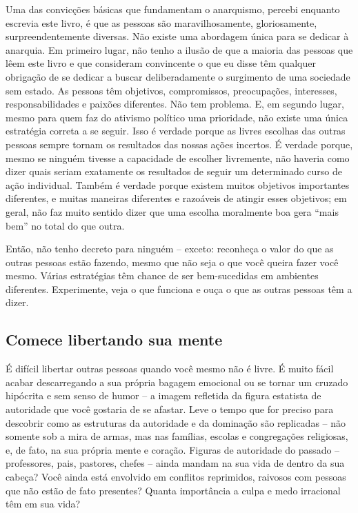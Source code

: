 Uma das convicções básicas que fundamentam o anarquismo, percebi enquanto escrevia este livro, é que as pessoas são maravilhosamente, gloriosamente, surpreendentemente diversas. Não existe uma abordagem única para se dedicar à anarquia. Em primeiro lugar, não tenho a ilusão de que a maioria das pessoas que lêem este livro e que consideram convincente o que eu disse têm qualquer obrigação de se dedicar a buscar deliberadamente o surgimento de uma sociedade sem estado. As pessoas têm objetivos, compromissos, preocupações, interesses, responsabilidades e paixões diferentes. Não tem problema. E, em segundo lugar, mesmo para quem faz do ativismo político uma prioridade, não existe uma única estratégia correta a se seguir. Isso é verdade porque as livres escolhas das outras pessoas sempre tornam os resultados das nossas ações incertos. É verdade porque, mesmo se ninguém tivesse a capacidade de escolher livremente, não haveria como dizer quais seriam exatamente os resultados de seguir um determinado curso de ação individual. Também é verdade porque existem muitos objetivos importantes diferentes, e muitas maneiras diferentes e razoáveis de atingir esses objetivos; em geral, não faz muito sentido dizer que uma escolha moralmente boa gera ``mais bem'' no total do que outra.

Então, não tenho decreto para ninguém -- exceto: reconheça o valor do que as outras pessoas estão fazendo, mesmo que não seja o que você queira fazer você mesmo. Várias estratégias têm chance de ser bem-sucedidas em ambientes diferentes. Experimente, veja o que funciona e ouça o que as outras pessoas têm a dizer.

\subsection*{Comece libertando sua mente}

É difícil libertar outras pessoas quando você mesmo não é livre. É muito fácil acabar descarregando a sua própria bagagem emocional ou se tornar um cruzado hipócrita e sem senso de humor -- a imagem refletida da figura estatista de autoridade que você gostaria de se afastar. Leve o tempo que for preciso para descobrir como as estruturas da autoridade e da dominação são replicadas -- não somente sob a mira de armas, mas nas famílias, escolas e congregações religiosas, e, de fato, na sua própria mente e coração. Figuras de autoridade do passado -- professores, pais, pastores, chefes -- ainda mandam na sua vida de dentro da sua cabeça? Você ainda está envolvido em conflitos reprimidos, raivosos com pessoas que não estão de fato presentes? Quanta importância a culpa e medo irracional têm em sua vida?

